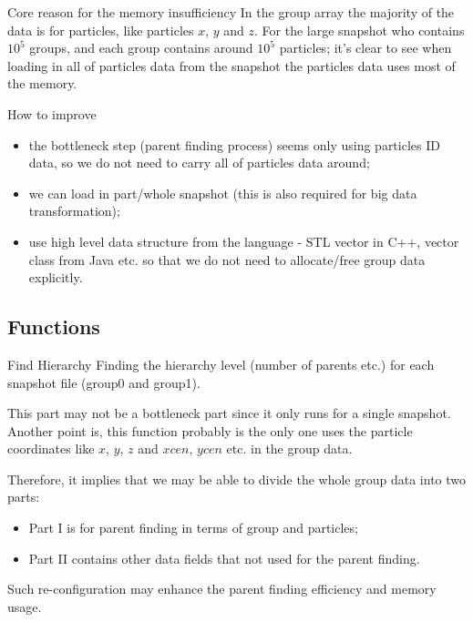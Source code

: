 \documentclass[notheorems, aspectratio=54]{beamer}
\begin{document}
\begin{frame}

\begin{block}{Core reason for the memory insufficiency}
In the group array the majority of the data is for particles, like particles $x$, $y$
and $z$. For the large snapshot who contains $10^5$ groups, and each group contains around $10^5$ particles; it's clear to see when loading in all of particles data from the snapshot the particles data uses most of the memory.
\end{block}

\begin{alertblock}{How to improve}
\begin{itemize}
 \item the bottleneck step (parent finding process) seems only using particles ID data, so we do not need to carry all of particles data around;
 \item we can load in part/whole snapshot (this is also required for big data transformation);
 \item use high level data structure from the language - STL vector in C++, vector class from Java etc. so that we do not need to allocate/free group data explicitly. 
\end{itemize}

 
\end{alertblock}



\end{frame}

\subsection{Functions}
\begin{frame}[fragile]

\begin{block}{Find Hierarchy}
 Finding the hierarchy level (number of parents etc.) for each snapshot file (group0 and group1). 
\end{block}
This part may not be a bottleneck part since it only runs for a single snapshot. Another point is, this function probably
is the only one uses the particle coordinates like $x$, $y$, $z$ and $xcen$, $ycen$ etc. in the group data.

Therefore, it implies that we may be able to divide the whole group data into two parts:
\begin{itemize}
 \item Part I is for parent finding in terms of group and particles;
 \item Part II contains other data fields that not used for the parent finding. 
\end{itemize}
Such re-configuration may enhance the parent finding efficiency and memory usage.


\end{frame}
\end{document}
